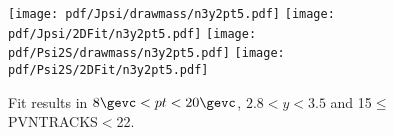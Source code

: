 \begin{figure}[H]
\begin{center}
\texttt{[image: pdf/Jpsi/drawmass/n3y2pt5.pdf]}
\texttt{[image: pdf/Jpsi/2DFit/n3y2pt5.pdf]}
\vspace*{-0.5cm}
\texttt{[image: pdf/Psi2S/drawmass/n3y2pt5.pdf]}
\texttt{[image: pdf/Psi2S/2DFit/n3y2pt5.pdf]}
\vspace*{-0.5cm}
\end{center}
\caption{Fit results in $8\gevc<pt<20\gevc$, $2.8<y<3.5$ and 15$\leq$PVNTRACKS$<$22.}
\label{Fitn3y2pt5}
\end{figure}
